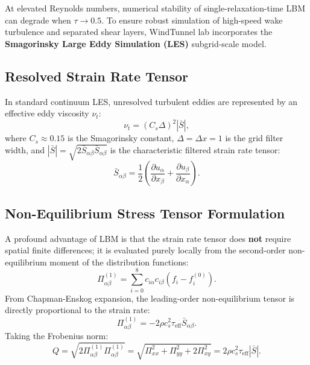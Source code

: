 \documentclass[11pt,a4paper]{article}
\begin{document}
At elevated Reynolds numbers, numerical stability of single-relaxation-time LBM can degrade when $\tau \to 0.5$. To ensure robust simulation of high-speed wake turbulence and separated shear layers, WindTunnel lab incorporates the \textbf{Smagorinsky Large Eddy Simulation (LES)} subgrid-scale model.

\subsection{Resolved Strain Rate Tensor}
In standard continuum LES, unresolved turbulent eddies are represented by an effective eddy viscosity $\nu_t$:
\begin{equation}
\nu_t = (C_s \Delta)^2 |\bar{S}|,
\end{equation}
where $C_s \approx 0.15$ is the Smagorinsky constant, $\Delta = \Delta x = 1$ is the grid filter width, and $|\bar{S}| = \sqrt{2 \bar{S}_{\alpha\beta} \bar{S}_{\alpha\beta}}$ is the characteristic filtered strain rate tensor:
\begin{equation}
\bar{S}_{\alpha\beta} = \frac{1}{2} \left( \frac{\partial u_\alpha}{\partial x_\beta} + \frac{\partial u_\beta}{\partial x_\alpha} \right).
\end{equation}

\subsection{Non-Equilibrium Stress Tensor Formulation}
A profound advantage of LBM is that the strain rate tensor does \textbf{not} require spatial finite differences; it is evaluated purely locally from the second-order non-equilibrium moment of the distribution functions:
\begin{equation}
\Pi_{\alpha\beta}^{(1)} = \sum_{i=0}^8 c_{i\alpha} c_{i\beta} \left( f_i - f_i^{(0)} \right).
\end{equation}
From Chapman-Enskog expansion, the leading-order non-equilibrium tensor is directly proportional to the strain rate:
\begin{equation}
\Pi_{\alpha\beta}^{(1)} = -2 \rho c_s^2 \tau_{\text{eff}} \bar{S}_{\alpha\beta}.
\end{equation}
Taking the Frobenius norm:
\begin{equation}
Q = \sqrt{2 \Pi_{\alpha\beta}^{(1)} \Pi_{\alpha\beta}^{(1)}} = \sqrt{\Pi_{xx}^2 + \Pi_{yy}^2 + 2\Pi_{xy}^2} = 2 \rho c_s^2 \tau_{\text{eff}} |\bar{S}|.
\end{equation}
\end{document}
